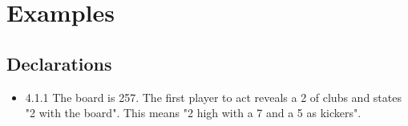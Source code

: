 \documentclass[a4paper,12pt]{article}
\begin{document}
\section{Examples}
\subsection{Declarations}
\begin{itemize}
\item  4.1.1 The board is 257. The first player to act reveals a 2 of clubs and states "2 with the board". This means "2 high with a 7 and a 5 as kickers".
\end{itemize}
\end{document}
